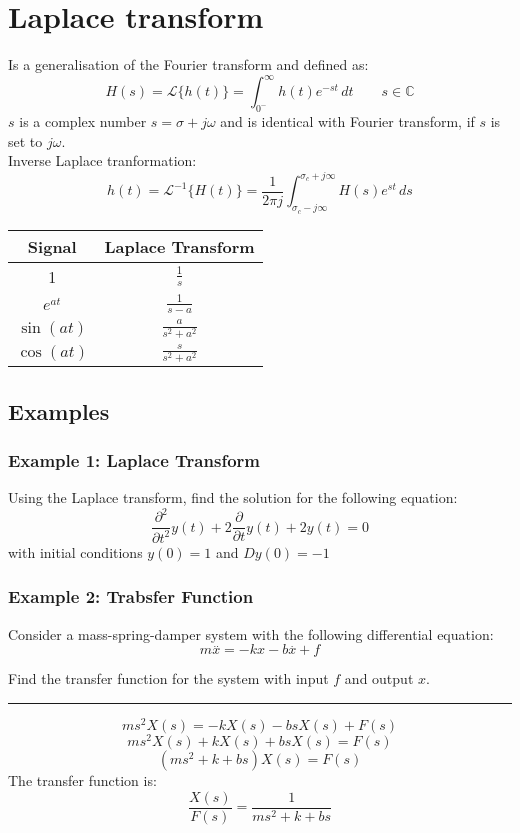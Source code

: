 \section{Laplace transform}
Is a generalisation of the Fourier transform and defined as:
$$H(s)=\mathcal{L}\{h(t)\}=\int_{0^-}^{\infty}h(t)e^{ -st }  \, dt \quad\quad s \in\mathbb{C}$$
$s$ is a complex number $s=\sigma+j\omega$ and is identical with Fourier transform, if $s$ is set to $j\omega$.\\
Inverse Laplace tranformation:
$$h(t)=\mathcal{L}^{-1}\{H(t)\}=\frac{1}{2\pi j}\int_{\sigma_{c}-j\infty}^{\sigma_{c}+j\infty} H(s)e^{ st } \, ds $$
\begin{table}[h]
\centering
\begin{tabular}{|c|c|}
\hline
\cellcolor[HTML]{C0C0C0} \textbf{Signal}& \cellcolor[HTML]{C0C0C0}\textbf{Laplace Transform}  \\ \hline
1&$\frac{1}{s}$ \\ \hline
$e^{at}$& $\frac{1}{s-a}$ \\ \hline
$\sin(at)$&$\frac{a}{s^2+a^2}$ \\ \hline
$\cos(at)$&$\frac{s}{s^2+a^2}$ \\ \hline
\end{tabular}
\end{table}
\subsection{Examples}
\subsubsection{Example 1: Laplace Transform}
Using the Laplace transform, find the solution for the following equation:
$$\frac{\partial^{2}}{\partial t^{2}}y(t)+2\frac{\partial}{\partial t}y(t)+2y(t)=0$$
with initial conditions $y (0) = 1$ and $Dy (0) = -1$
\subsubsection{Example 2: Trabsfer Function}
Consider a mass-spring-damper system with the following differential equation:
$$m\overset{..}{x}=-kx-b\overset{.}{x}+f$$

Find the transfer function for the system with input $f$ and output $x$.

\rule{\textwidth}{0.5pt}

$$ms^2X(s)=-kX(s)-bsX(s)+F(s)$$
$$ms^2X(s)+kX(s)+bsX(s)=F(s)$$
$$(ms^2+k+bs)X(s)=F(s)$$
The transfer function is:
$$\frac{X(s)}{F(s)}=\displaystyle\frac{1}{ms^2+k+bs}$$

